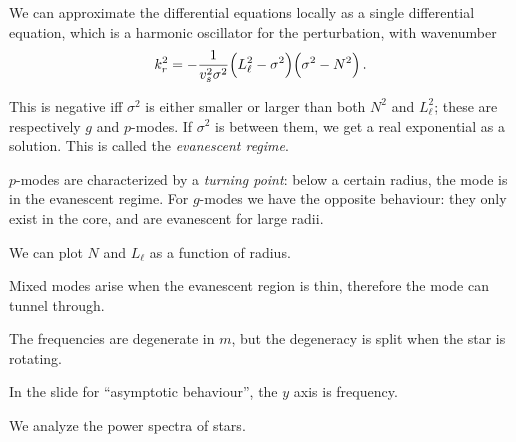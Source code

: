 \documentclass[main.tex]{subfiles}
\begin{document}
We can approximate the differential equations locally as a single differential equation, which is a harmonic oscillator for the perturbation, with wavenumber
%
\begin{equation}
  k^2_r = - \frac{1}{v_s^2 \sigma^2 } \qty(L_\ell^2- \sigma^2   ) \qty(\sigma^2 - N^2)
\,.
\end{equation}

This is negative iff \(\sigma^2\) is either smaller or larger than both \(N^2\) and \(L_\ell^2\); these are respectively \(g\) and \(p\)-modes. If \(\sigma^2\) is between them, we get a real exponential as a solution.
This is called the \emph{evanescent regime}.

\(p\)-modes are characterized by a \emph{turning point}: below a certain radius, the mode is in the evanescent regime.
For \(g\)-modes we have the opposite behaviour: they only exist in the core, and are evanescent for large radii. 

We can plot \(N\) and \(L_\ell\) as a function of radius.

Mixed modes arise when the evanescent region is thin, therefore the mode can tunnel through.

The frequencies are degenerate in \(m\), but the degeneracy is split when the star is rotating.

In the slide for ``asymptotic behaviour'', the \(y\) axis is frequency.

We analyze the power spectra of stars.
\end{document}
